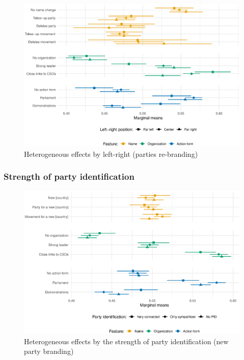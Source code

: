 \documentclass[12pt]{article}
\begin{document}
\begin{figure}[H]
\includegraphics[width=\textwidth]{./Figures/CJ2_heteff_ideol_tradeoff.eps}
\caption{Heterogeneous effects by left-right (parties re-branding)}
\end{figure}

\subsubsection{Strength of party identification}

\begin{figure}[H]
\includegraphics[width=\textwidth]{./Figures/CJ1_heteff_pid_strength_tradeoff.eps}
\caption{Heterogeneous effects by the strength of party identification (new party branding)}
\end{figure}
\end{document}
